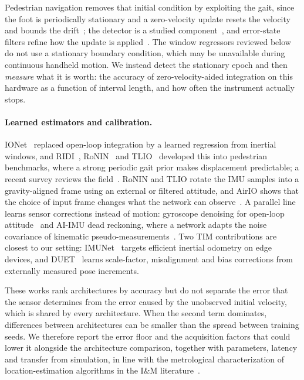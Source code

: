 Pedestrian navigation removes that initial condition by exploiting the gait,
since the foot is periodically stationary and a zero-velocity update resets
the velocity and bounds the drift~\cite{foxlin2005pedestrian}; the detector is
a studied component~\cite{skog2010zerovelocity}, and error-state filters
refine how the update is applied~\cite{eskfzupt2024}. The window regressors reviewed below do not use a
stationary boundary condition, which may be unavailable during continuous
handheld motion. We instead detect the stationary epoch
and then \emph{measure} what it is worth: the accuracy of
zero-velocity-aided integration on this hardware as a function of interval
length, and how often the instrument actually stops.

\paragraph{Learned estimators and calibration.}
IONet~\cite{chen2018ionet} replaced open-loop integration by a learned
regression from inertial windows, and
RIDI~\cite{yan2018ridi}, RoNIN~\cite{yan2020ronin} and TLIO~\cite{liu2020tlio}
developed this into pedestrian benchmarks, where a strong periodic gait prior
makes displacement predictable; a recent survey reviews the
field~\cite{chen2024survey}. RoNIN and TLIO rotate the IMU samples into a
gravity-aligned frame using an external or filtered attitude, and AirIO shows
that the choice of input frame changes what the network can
observe~\cite{qiu2025airio}. A parallel line learns sensor corrections instead
of motion: gyroscope denoising for open-loop
attitude~\cite{brossard2020denoising} and AI-IMU dead reckoning, where a
network adapts the noise covariance of kinematic pseudo-measurements~\cite{brossard2020aiimu}.
Two TIM contributions are closest to our setting: IMUNet~\cite{zeinali2024imunet}
targets efficient inertial odometry on edge devices, and
DUET~\cite{liu2023duet} learns scale-factor, misalignment and bias corrections
from externally measured pose increments.

These works rank architectures by accuracy but do not separate the error that
the sensor determines from the error caused by the unobserved initial
velocity, which is shared by every architecture. When the second term
dominates, differences between architectures can be smaller than the spread
between training seeds. We therefore report the error floor and the
acquisition factors that could lower it alongside the architecture
comparison, together with parameters, latency and transfer from simulation,
in line with the metrological characterization of location-estimation
algorithms in the I\&M literature~\cite{carbone2015navigation}.

